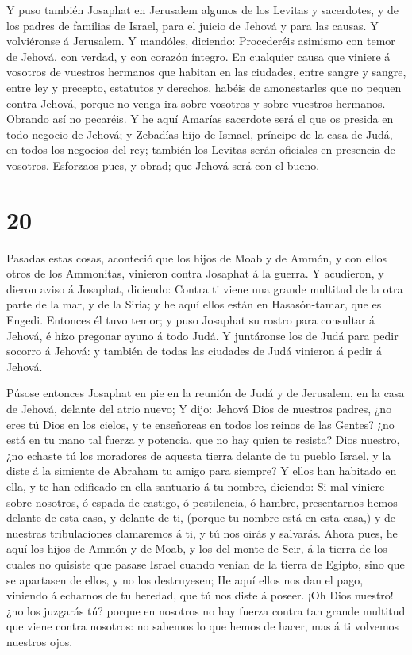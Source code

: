  Y puso también Josaphat en Jerusalem algunos de los Levitas
y sacerdotes, y de los padres de familias de Israel, para el juicio de
Jehová y para las causas. Y volviéronse á Jerusalem.  Y
mandóles, diciendo: Procederéis asimismo con temor de Jehová, con
verdad, y con corazón íntegro.  En cualquier causa que
viniere á vosotros de vuestros hermanos que habitan en las ciudades,
entre sangre y sangre, entre ley y precepto, estatutos y derechos,
habéis de amonestarles que no pequen contra Jehová, porque no venga ira
sobre vosotros y sobre vuestros hermanos. Obrando así no pecaréis.
 Y he aquí Amarías sacerdote será el que os presida en todo
negocio de Jehová; y Zebadías hijo de Ismael, príncipe de la casa de
Judá, en todos los negocios del rey; también los Levitas serán oficiales
en presencia de vosotros. Esforzaos pues, y obrad; que Jehová será con
el bueno.

\hypertarget{section-19}{%
\section{20}\label{section-19}}

 Pasadas estas cosas, aconteció que los hijos de Moab y de
Ammón, y con ellos otros de los Ammonitas, vinieron contra Josaphat á la
guerra.  Y acudieron, y dieron aviso á Josaphat, diciendo:
Contra ti viene una grande multitud de la otra parte de la mar, y de la
Siria; y he aquí ellos están en Hasasón-tamar, que es Engedi.
 Entonces él tuvo temor; y puso Josaphat su rostro para
consultar á Jehová, é hizo pregonar ayuno á todo Judá.  Y
juntáronse los de Judá para pedir socorro á Jehová: y también de todas
las ciudades de Judá vinieron á pedir á Jehová.

 Púsose entonces Josaphat en pie en la reunión de Judá y de
Jerusalem, en la casa de Jehová, delante del atrio nuevo;  Y
dijo: Jehová Dios de nuestros padres, ¿no eres tú Dios en los cielos, y
te enseñoreas en todos los reinos de las Gentes? ¿no está en tu mano tal
fuerza y potencia, que no hay quien te resista?  Dios
nuestro, ¿no echaste tú los moradores de aquesta tierra delante de tu
pueblo Israel, y la diste á la simiente de Abraham tu amigo para
siempre?  Y ellos han habitado en ella, y te han edificado
en ella santuario á tu nombre, diciendo:  Si mal viniere
sobre nosotros, ó espada de castigo, ó pestilencia, ó hambre,
presentarnos hemos delante de esta casa, y delante de ti, (porque tu
nombre está en esta casa,) y de nuestras tribulaciones clamaremos á ti,
y tú nos oirás y salvarás.  Ahora pues, he aquí los hijos
de Ammón y de Moab, y los del monte de Seir, á la tierra de los cuales
no quisiste que pasase Israel cuando venían de la tierra de Egipto, sino
que se apartasen de ellos, y no los destruyesen;  He aquí
ellos nos dan el pago, viniendo á echarnos de tu heredad, que tú nos
diste á poseer.  ¡Oh Dios nuestro! ¿no los juzgarás tú?
porque en nosotros no hay fuerza contra tan grande multitud que viene
contra nosotros: no sabemos lo que hemos de hacer, mas á ti volvemos
nuestros ojos.

